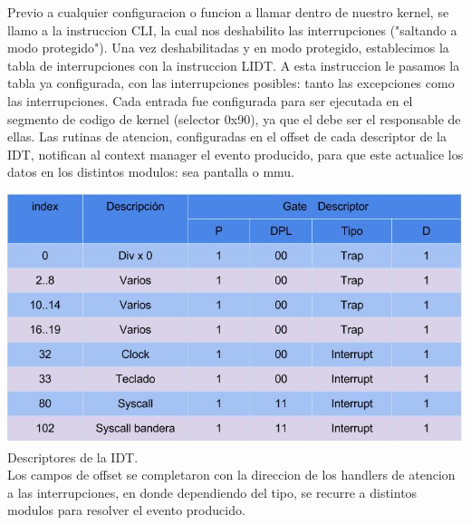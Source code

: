 Previo a cualquier configuracion o funcion a llamar dentro de nuestro kernel, se llamo a la instruccion CLI, la cual nos deshabilito las interrupciones ("saltando a modo protegido"). Una vez deshabilitadas y en modo protegido, establecimos la tabla de interrupciones con la instruccion LIDT. A esta instruccion le pasamos la tabla ya configurada, con las interrupciones posibles: tanto las excepciones como las interrupciones. Cada entrada fue configurada para ser ejecutada en el segmento de codigo de kernel (selector 0x90), ya que el debe ser el responsable de ellas. Las rutinas de atencion, configuradas en el offset de cada descriptor de la IDT, notifican al context manager el evento producido, para que este actualice los datos en los distintos modulos: sea pantalla o mmu. 

\includegraphics[scale=0.4]{diagramas/idt.jpg}
\\Descriptores de la IDT.\\

Los campos de offset se completaron con la direccion de los handlers de atencion a las interrupciones, en donde dependiendo del tipo, se recurre a distintos modulos para resolver el evento producido.\\


